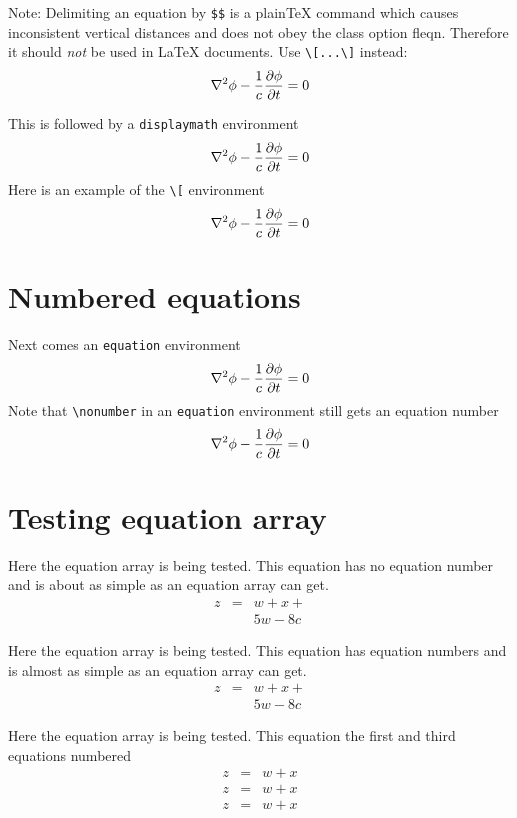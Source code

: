 \documentclass{article}
\begin{document}
Note: Delimiting an equation by \verb|$$| is a plain\TeX{} command
which causes inconsistent vertical distances and does not obey
the class option \textsf{fleqn}.
Therefore it should \emph{not} be used in \LaTeX{} documents. Use
\verb#\[...\]# instead:
\[
\nabla^2 \phi -{1\over c} {\partial \phi\over \partial t}  = 0
\]


This is followed by a \verb#displaymath# environment
\begin{displaymath}
\nabla^2 \phi -{1\over c} {\partial \phi\over \partial t}  = 0
\end{displaymath}
Here is an example of the \verb#\[# environment
\[
\nabla^2 \phi -{1\over c} {\partial \phi\over \partial t}  = 0
\]


\section{Numbered equations}
Next comes an \verb#equation# environment
\begin{equation}
\nabla^2 \phi -{1\over c} {\partial \phi\over \partial t}  = 0
\end{equation}
Note that \verb#\nonumber# in an \verb#equation# environment still gets
an equation number
\begin{equation}
\nabla^2 \phi -{1\over c} {\partial \phi\over \partial t}  = 0 \nonumber
\end{equation}

\section{Testing equation array}

Here the equation array is being tested.  This equation has no equation number
and is about as simple as an equation array can get.
\begin{eqnarray*}
z & = & w + x + \\
  &   & 5w - 8c 
\end{eqnarray*}

Here the equation array is being tested.  This equation has equation numbers
and is almost as simple as an equation array can get.
\begin{eqnarray}
z & = & w + x + \\
  &   & 5w - 8c 
\end{eqnarray}

Here the equation array is being tested.  This equation the first and third equations numbered
\begin{eqnarray}
z & = & w + x  \\
z & = & w + x \nonumber\\
z & = & w + x  
\end{eqnarray}
\end{document}
